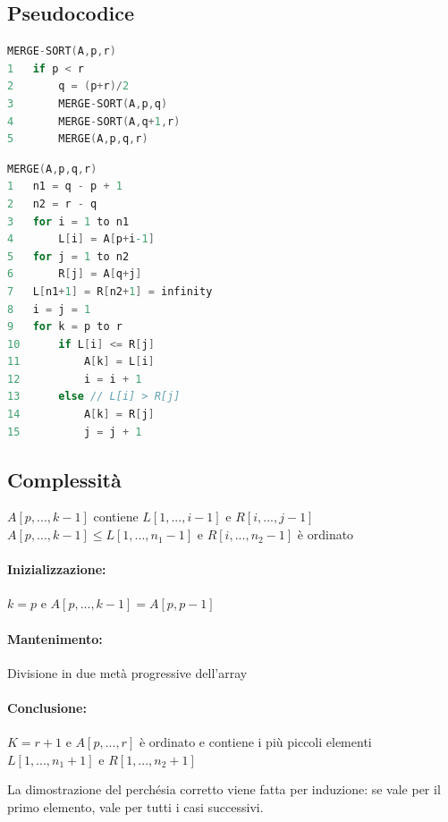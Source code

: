 \subsection{Pseudocodice}
\begin{mdframed}
\begin{lstlisting}[language=C]
MERGE-SORT(A,p,r)
1   if p < r
2       q = (p+r)/2
3       MERGE-SORT(A,p,q)
4       MERGE-SORT(A,q+1,r)
5       MERGE(A,p,q,r)
\end{lstlisting}
\end{mdframed}
\begin{mdframed}
\begin{lstlisting}[language=C]
MERGE(A,p,q,r)
1   n1 = q - p + 1
2   n2 = r - q
3   for i = 1 to n1
4       L[i] = A[p+i-1]
5   for j = 1 to n2
6       R[j] = A[q+j]
7   L[n1+1] = R[n2+1] = infinity
8   i = j = 1
9   for k = p to r
10      if L[i] <= R[j]
11          A[k] = L[i]
12          i = i + 1
13      else // L[i] > R[j]
14          A[k] = R[j]
15          j = j + 1
\end{lstlisting}
\end{mdframed}

\subsection{Complessità}
$A[p, ..., k-1]$ contiene $L[1, ..., i-1]$ e $R[i, ..., j-1]$
$A[p, ..., k-1] \leq L[1, ..., n_1-1]$ e $R[i, ..., n_2-1]$ è ordinato

\paragraph{Inizializzazione:} $k=p$ e $A[p, ..., k-1] = A[p, p-1]$
\paragraph{Mantenimento:} Divisione in due metà progressive dell'array
\paragraph{Conclusione:} $K = r+1$ e $A[p, ..., r]$ è ordinato e contiene i più  piccoli elementi $L[1, ..., n_1+1]$ e $R[1, ..., n_2+1]$

La dimostrazione del perchésia corretto viene fatta per induzione: se vale per il primo elemento, vale per tutti i casi successivi.

\newpage